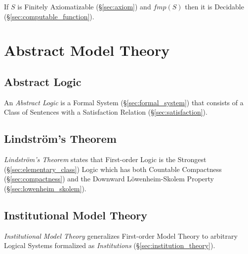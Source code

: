 If $S$ is Finitely Axiomatizable (\S\ref{sec:axiom}) and $fmp(S)$ then
it is Decidable (\S\ref{sec:computable_function}).



\section{Abstract Model Theory}\label{sec:abstract_model}

\subsection{Abstract Logic}\label{sec:abstract_logic}

An \emph{Abstract Logic} is a Formal System
(\S\ref{sec:formal_system}) that consists of a Class of Sentences with
a Satisfaction Relation (\S\ref{sec:satisfaction}).



\subsection{Lindstr\"om's Theorem}\label{sec:lindstroms_theorem}

\emph{Lindstr\"om's Theorem} states that First-order Logic is the
Strongest (\S\ref{sec:elementary_class}) Logic which has both
Countable Compactness (\S\ref{sec:compactness}) and the Downward
L\"owenheim-Skolem Property (\S\ref{sec:lowenheim_skolem}).



\subsection{Institutional Model Theory}\label{sec:institutional_model}

\emph{Institutional Model Theory} generalizes First-order Model Theory
to arbitrary Logical Systems formalized as \emph{Institutions}
(\S\ref{sec:institution_theory}).

